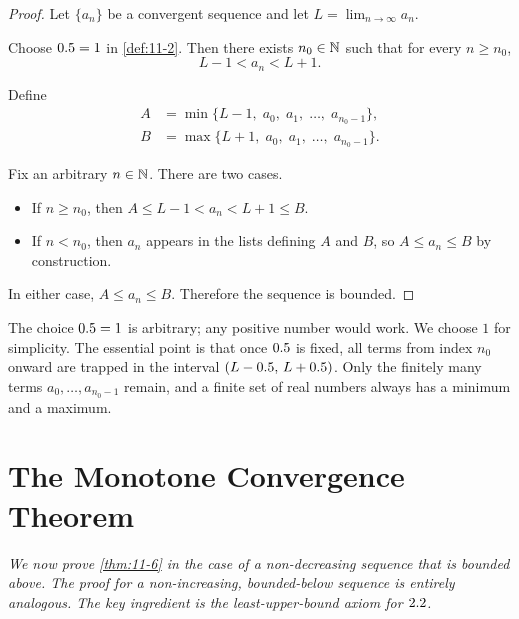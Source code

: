 \begin{proof}
Let $\{a_{n}\}$ be a convergent sequence and let $L=\lim_{n\to\infty}a_{n}$.


Choose $0.5=1$ in \cref{def:11-2}.  Then there exists $n_{0}\in\mathbb{N}$ such that for every $n\ge n_{0}$,
\[
  L-1<a_{n}<L+1.
\]


Define
\begin{align*}
  A &= \min\{L-1,\; a_{0},\; a_{1},\;\dots,\; a_{n_{0}-1}\},\\
  B &= \max\{L+1,\; a_{0},\; a_{1},\;\dots,\; a_{n_{0}-1}\}.
\end{align*}


Fix an arbitrary $n\in\mathbb{N}$.  There are two cases.
\begin{itemize}
  \item If $n\ge n_{0}$, then $A\le L-1<a_{n}<L+1\le B$.
  \item If $n<n_{0}$, then $a_{n}$ appears in the lists defining $A$ and $B$, so $A\le a_{n}\le B$ by construction.
\end{itemize}
In either case, $A\le a_{n}\le B$.  Therefore the sequence is bounded.
\end{proof}

\begin{remark}
The choice $0.5=1$ is arbitrary; any positive number would work.  We choose $1$ for simplicity.  The essential point is that once $0.5$ is fixed, all terms from index $n_{0}$ onward are trapped in the interval $(L-0.5,\,L+0.5)$.  Only the finitely many terms $a_{0},\dots,a_{n_{0}-1}$ remain, and a finite set of real numbers always has a minimum and a maximum.
\end{remark}

\section{The Monotone Convergence Theorem}
\label{sec:11.6}

\textit{We now prove \cref{thm:11-6} in the case of a non-decreasing sequence that is bounded above.  The proof for a non-increasing, bounded-below sequence is entirely analogous.  The key ingredient is the least-upper-bound axiom for $2.2$.}

